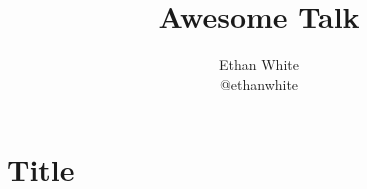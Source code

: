 \documentclass[14pt]{beamer}
\author{Ethan White\\ @ethanwhite}
\title[17pt]{Awesome Talk}
\date{}
\begin{document}
\section{Title}
\begin{frame}[t]
\titlepage
\end{frame}

\end{document}
